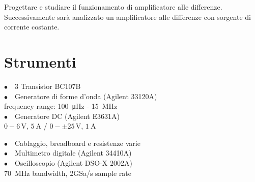 Progettare e studiare il funzionamento di amplificatore alle differenze. Successivamente sarà analizzato un amplificatore alle differenze con sorgente di corrente costante. 

\section{Strumenti}
%
\noindent
\begin{minipage}{.5\linewidth}
$\bullet \quad$3 Transistor BC107B\\
$\bullet \quad$Generatore di forme d'onda (Agilent 33120A)\\
\phantom{xxxx}frequency range: \SI{100}{\micro\hertz} - \SI{15}{\mega\hertz}\\
$\bullet \quad$Generatore DC (Agilent E3631A)\\
\phantom{xxxx}$0-6\,\si{\volt}$, $\SI{5}{\ampere}$ / $0-\pm25\,\si{\volt}$, $\SI{1}{\ampere}$\\
\end{minipage}%
\begin{minipage}{.5\linewidth}
$\bullet \quad$Cablaggio, breadboard e resistenze varie\\
$\bullet \quad$Multimetro digitale (Agilent 34410A)\\
$\bullet \quad$Oscilloscopio (Agilent DSO-X 2002A)\\
\phantom{xxxx}\SI{70}{\mega\hertz} bandwidth, 2GSa/s sample rate\\
\end{minipage}